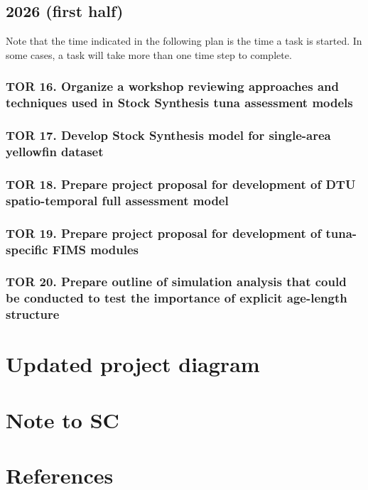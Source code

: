 \documentclass{SCreport}
\begin{document}
\subsection{2026 (first half)}

Note that the time indicated in the following plan is the time a task is
started. In some cases, a task will take more than one time step to complete.

\subsubsection{TOR 16. Organize a workshop reviewing approaches and techniques
  used in Stock Synthesis tuna assessment models}

\subsubsection{TOR 17. Develop Stock Synthesis model for single-area yellowfin
  dataset}

\subsubsection{TOR 18. Prepare project proposal for development of DTU
  spatio-temporal full assessment model}

\subsubsection{TOR 19. Prepare project proposal for development of tuna-specific
  FIMS modules}

\subsubsection{TOR 20. Prepare outline of simulation analysis that could be
  conducted to test the importance of explicit age-length structure}

\section{Updated project diagram}

\section{Note to SC}

\section{References}
\end{document}
